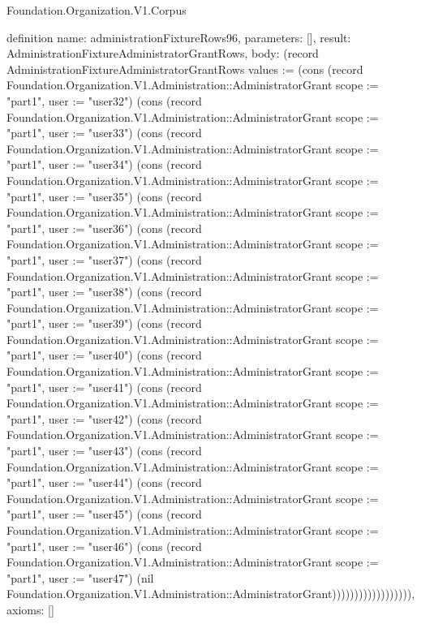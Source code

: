 \begin{lexlean}{Foundation.Organization.V1.Corpus}
\begin{semanticmodule}
definition{
  name: administrationFixtureRows96,
  parameters: [],
  result: AdministrationFixtureAdministratorGrantRows,
  body: (record AdministrationFixtureAdministratorGrantRows {values := (cons (record Foundation.Organization.V1.Administration::AdministratorGrant {scope := "part1", user := "user32"}) (cons (record Foundation.Organization.V1.Administration::AdministratorGrant {scope := "part1", user := "user33"}) (cons (record Foundation.Organization.V1.Administration::AdministratorGrant {scope := "part1", user := "user34"}) (cons (record Foundation.Organization.V1.Administration::AdministratorGrant {scope := "part1", user := "user35"}) (cons (record Foundation.Organization.V1.Administration::AdministratorGrant {scope := "part1", user := "user36"}) (cons (record Foundation.Organization.V1.Administration::AdministratorGrant {scope := "part1", user := "user37"}) (cons (record Foundation.Organization.V1.Administration::AdministratorGrant {scope := "part1", user := "user38"}) (cons (record Foundation.Organization.V1.Administration::AdministratorGrant {scope := "part1", user := "user39"}) (cons (record Foundation.Organization.V1.Administration::AdministratorGrant {scope := "part1", user := "user40"}) (cons (record Foundation.Organization.V1.Administration::AdministratorGrant {scope := "part1", user := "user41"}) (cons (record Foundation.Organization.V1.Administration::AdministratorGrant {scope := "part1", user := "user42"}) (cons (record Foundation.Organization.V1.Administration::AdministratorGrant {scope := "part1", user := "user43"}) (cons (record Foundation.Organization.V1.Administration::AdministratorGrant {scope := "part1", user := "user44"}) (cons (record Foundation.Organization.V1.Administration::AdministratorGrant {scope := "part1", user := "user45"}) (cons (record Foundation.Organization.V1.Administration::AdministratorGrant {scope := "part1", user := "user46"}) (cons (record Foundation.Organization.V1.Administration::AdministratorGrant {scope := "part1", user := "user47"}) (nil Foundation.Organization.V1.Administration::AdministratorGrant)))))))))))))))))}),
  axioms: []
}


\end{semanticmodule}
\end{lexlean}

